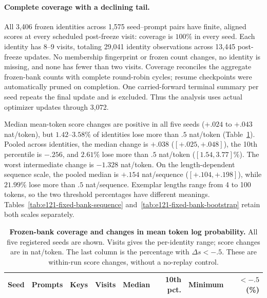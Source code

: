 \documentclass{article}
\newcommand{\1}{\mathbf 1}
\theoremstyle{remark}
\theoremstyle{definition}
\theoremstyle{plain}
\begin{document}
\paragraph{Complete coverage with a declining tail.}
All 3,406 frozen identities across 1,575 seed--prompt pairs have finite,
aligned scores at every scheduled post-freeze visit: coverage is $100\%$ in
every seed. Each identity has 8--9 visits, totaling 29,041 identity observations
across 13,445 post-freeze updates. No membership fingerprint or frozen count
changes, no identity is missing, and none has fewer than two visits.
Coverage reconciles the aggregate frozen-bank counts with complete round-robin
cycles; resume checkpoints were automatically pruned on completion. One
carried-forward terminal summary per seed repeats the final update and is
excluded. Thus the analysis uses actual optimizer updates through 3,072.

Median mean-token score changes are positive in all five seeds
($+.024$ to $+.043$ nat/token), but $1.42$--$3.58\%$ of identities lose more
than $.5$ nat/token (Table~\ref{tab:e121-fixed-bank}). Pooled across identities,
the median change is $+.038$ ($[+.025,+.048]$), the 10th percentile is $-.256$,
and $2.61\%$ lose more than $.5$ nat/token ($[1.54,3.77]\%$).
The worst intermediate change is $-1.328$ nat/token. On the length-dependent
sequence scale, the pooled median is $+.154$ nat/sequence
($[+.104,+.198]$), while $21.99\%$ lose more than $.5$ nat/sequence.
Exemplar lengths range from 4 to 100 tokens, so the two threshold percentages
have different meanings. Tables~\ref{tab:e121-fixed-bank-sequence}
and~\ref{tab:e121-fixed-bank-bootstrap} retain both scales separately.

\begin{table}[H]
  \centering
  \caption{\textbf{Frozen-bank coverage and changes in mean token log probability.}
  All five registered seeds are shown. Visits gives the per-identity range;
  score changes are in nat/token. The last column is the percentage with
  $\Delta s<-.5$. These are within-run score changes, without a no-replay
  control.}
  \label{tab:e121-fixed-bank}
  \small
  \setlength{\tabcolsep}{4pt}
  \begin{tabular}{@{}lrrrrrrr@{}}
    \toprule
    \textbf{Seed} & \textbf{Prompts} & \textbf{Keys} & \textbf{Visits}
      & \textbf{Median} & \textbf{10th pct.} & \textbf{Minimum}
      & \textbf{$<-.5$ (\%)} \\
    \midrule
    
  \end{tabular}
\end{table}
\end{document}
